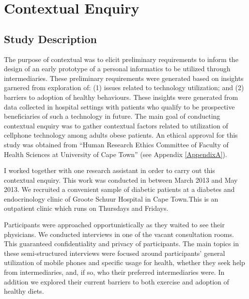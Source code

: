 
\chapter{Contextual Enquiry} %

\label{contextualenqchapter} %


\section{Study Description}
The purpose of contextual was to elicit preliminary requirements to inform the design of an early prototype of a personal informatics to be utilized through intermediaries. These preliminary requirements were generated based on insights garnered from exploration of: (1) issues related  to technology utilization; and (2) barriers to adoption of healthy behaviours. These insights were generated from data collected in hospital settings with patients who qualify to be prospective beneficiaries of such a technology in future. The main goal of conducting contextual enquiry was to gather contextual factors related to utilization of cellphone technology among adults obese patients. An ethical approval for this study was obtained from ``Human Research Ethics Committee of Faculty of Health Sciences at University of Cape Town'' (see Appendix \ref{AppendixA}).

I worked together with one research assistant in order to carry out this contextual enquiry. This work was conducted in between March 2013 and May 2013. We recruited a convenient sample of diabetic patients at a diabetes and endocrinology clinic of Groote Schuur Hospital in Cape Town.This is an outpatient clinic which runs on Thursdays and Fridays.

Participants were approached opportunistically as they waited to see their physicians. We conducted interviews in one of the vacant consultation rooms. This guaranteed confidentiality and privacy of participants. The main topics in these semi-structured interviews were focused around participants' general utilization of mobile phones and specific usage for health, whether they seek help from intermediaries, and, if so, who their preferred intermediaries were. In addition we explored their current barriers to both exercise  and adoption of healthy diets.

